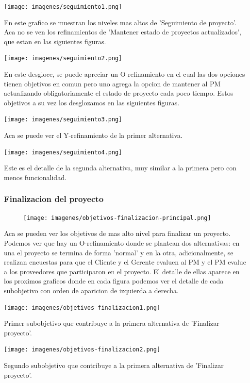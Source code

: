 \texttt{[image: imagenes/seguimiento1.png]}

En este grafico se muestran los niveles mas altos de 'Seguimiento de proyecto'. Aca no se ven los refinamientos de 'Mantener estado de proyectos actualizados', que estan en las siguientes figuras.

\texttt{[image: imagenes/seguimiento2.png]}

En este desgloce, se puede apreciar un O-refinamiento en el cual las dos opciones tienen objetivos en comun pero uno agrega la opcion de mantener al PM actualizando obligatoriamente el estado de proyecto cada poco tiempo. Estos objetivos a su vez los desglozamos en las siguientes figuras.

\texttt{[image: imagenes/seguimiento3.png]}

Aca se puede ver el Y-refinamiento de la primer alternativa.

\texttt{[image: imagenes/seguimiento4.png]}

Este es el detalle de la segunda alternativa, muy similar a la primera pero con menos funcionalidad.

\newpage

\subsubsection{Finalizacion del proyecto}

\begin{figure}[H]
    \centering
    \texttt{[image: imagenes/objetivos-finalizacion-principal.png]}
\end{figure}

Aca se pueden ver los objetivos de mas alto nivel para finalizar un proyecto. Podemos ver que hay un O-refinamiento donde se plantean dos alternativas: en una el proyecto se termina de forma 'normal' y en la otra, adicionalmente, se realizan encuestas para que el Cliente y el Gerente evaluen al PM y el PM evalue a los proveedores que participaron en el proyecto. El detalle de ellas aparece en los proximos graficos donde en cada figura podemos ver el detalle de cada subobjetivo con orden de aparicion de izquierda a derecha.

\texttt{[image: imagenes/objetivos-finalizacion1.png]}

Primer subobjetivo que contribuye a la primera alternativa de 'Finalizar proyecto'.

\texttt{[image: imagenes/objetivos-finalizacion2.png]}

Segundo subobjetivo que contribuye a la primera alternativa de 'Finalizar proyecto'.

